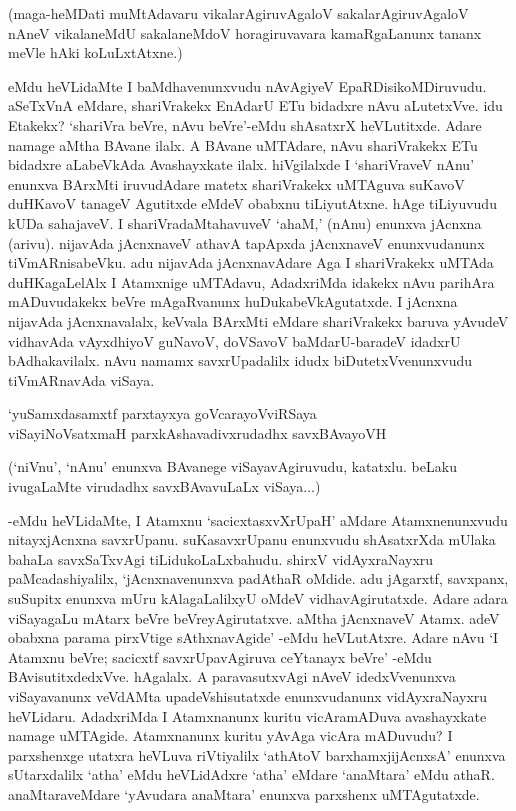 (maga-heMDati muMtAdavaru vikalarAgiruvAgaloV sakalarAgiruvAgaloV nAneV vikalaneMdU sakalaneMdoV horagiruvavara kamaRgaLanunx tananx meVle hAki koLuLxtAtxne.)

eMdu heVLidaMte I baMdhavenunxvudu nAvAgiyeV EpaRDisikoMDiruvudu. aSeTxVnA eMdare, shariVrakekx EnAdarU ETu bidadxre nAvu aLutetxVve. idu Etakekx? `shariVra beVre, nAvu beVre'-eMdu shAsatxrX heVLutitxde. Adare namage aMtha BAvane ilalx. A BAvane uMTAdare, nAvu shariVrakekx ETu bidadxre aLabeVkAda Avashayxkate ilalx. hiVgilalxde I `shariVraveV nAnu' enunxva BArxMti iruvudAdare matetx shariVrakekx uMTAguva suKavoV duHKavoV tanageV Agutitxde eMdeV obabxnu tiLiyutAtxne. hAge tiLiyuvudu kUDa sahajaveV. I shariVradaMtahavuveV `ahaM,' (nAnu) enunxva jAcnxna (arivu). nijavAda jAcnxnaveV athavA tapApxda jAcnxnaveV enunxvudanunx tiVmARnisabeVku. adu nijavAda jAcnxnavAdare Aga I shariVrakekx uMTAda duHKagaLelAlx I Atamxnige uMTAdavu, AdadxriMda idakekx nAvu parihAra mADuvudakekx beVre mAgaRvanunx huDukabeVkAgutatxde. I jAcnxna nijavAda jAcnxnavalalx, keVvala BArxMti eMdare shariVrakekx baruva yAvudeV vidhavAda vAyxdhiyoV guNavoV, doVSavoV baMdarU-baradeV idadxrU bAdhakavilalx. nAvu namamx savxrUpadalilx idudx biDutetxVvenunxvudu tiVmARnavAda viSaya.

\begin{shloka}
`yuSamxdasamxtf parxtayxya goVcarayoVviRSaya\\
viSayiNoVsatxmaH parxkAshavadivxrudadhx savxBAvayoVH
\end{shloka}

(`niVnu', `nAnu' enunxva BAvanege viSayavAgiruvudu, katatxlu. beLaku ivugaLaMte virudadhx savxBAvavuLaLx viSaya$\ldots$)

-eMdu heVLidaMte, I Atamxnu `sacicxtasxvXrUpaH' aMdare Atamxnenunxvudu nitayxjAcnxna savxrUpanu. suKasavxrUpanu enunxvudu shAsatxrXda mUlaka bahaLa savxSaTxvAgi tiLidukoLaLxbahudu. shirxV vidAyxraNayxru paMcadashiyalilx, `jAcnxnavenunxva padAthaR oMdide. adu jAgarxtf, savxpanx, suSupitx enunxva mUru kAlagaLalilxyU oMdeV vidhavAgirutatxde. Adare adara viSayagaLu mAtarx beVre beVreyAgirutatxve. aMtha jAcnxnaveV Atamx. adeV obabxna parama pirxVtige sAthxnavAgide' -eMdu heVLutAtxre. Adare nAvu `I Atamxnu beVre; sacicxtf savxrUpavAgiruva ceYtanayx beVre' -eMdu BAvisutitxdedxVve. hAgalalx. A paravasutxvAgi nAveV idedxVvenunxva viSayavanunx veVdAMta upadeVshisutatxde enunxvudanunx vidAyxraNayxru heVLidaru. AdadxriMda I Atamxnanunx kuritu vicAramADuva avashayxkate namage uMTAgide. Atamxnanunx kuritu yAvAga vicAra mADuvudu? I parxshenxge utatxra heVLuva riVtiyalilx `athAtoV barxhamxjijAcnxsA' enunxva sUtarxdalilx `atha' eMdu heVLidAdxre `atha' eMdare `anaMtara' eMdu athaR. anaMtaraveMdare `yAvudara anaMtara' enunxva parxshenx uMTAgutatxde.

